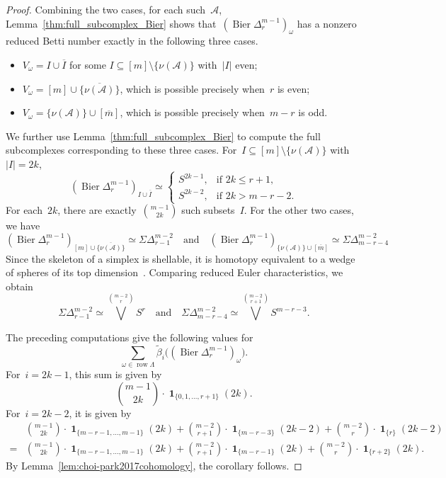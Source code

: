 \documentclass[11pt]{amsart}
\theoremstyle{plain}
\numberwithin{equation}{section}
\theoremstyle{definition}
\newcommand{\cA}{\mathcal{A}}
\DeclareMathOperator{\row}{row}
\DeclareMathOperator{\Bier}{Bier}
\DeclareMathOperator{\ind}{\mathbf{1}}
\begin{document}
\begin{proof}
Combining the two cases, for each such~$\cA$, Lemma~\ref{thm:full_subcomplex_Bier} shows that~$(\Bier\Delta_r^{m-1})_\omega$ has a nonzero reduced Betti number exactly in the following three cases.
\begin{itemize}
    \item $V_\omega=I\cup\overline{I}$ for some $I\subseteq[m]\setminus\{\nu(\cA)\}$ with~$|I|$ even;
    \item $V_\omega=[m]\cup\{\overline{\nu(\cA)}\}$, which is possible precisely when~$r$ is even;
    \item $V_\omega=\{\nu(\cA)\}\cup[\overline{m}]$, which is possible precisely when~$m-r$ is odd. 
\end{itemize}
We further use Lemma~\ref{thm:full_subcomplex_Bier} to compute the full subcomplexes corresponding to these three cases. 
For~$I\subseteq[m]\setminus\{\nu(\cA)\}$ with~$|I|=2k$, 
$$
    (\Bier\Delta_r^{m-1})_{I\cup\overline{I}} \simeq 
    \begin{cases} 
        S^{2k-1}, & \text{if } 2k\leq r+1,\\ 
        S^{2k-2}, & \text{if } 2k>m-r-2. 
    \end{cases}
$$
For each~$2k$, there are exactly~$\binom{m-1}{2k}$ such subsets~$I$. 
For the other two cases, we have
$$ 
    (\Bier\Delta_r^{m-1})_{[m]\cup\{\overline{\nu(\cA)}\}} \simeq \Sigma\Delta_{r-1}^{m-2} 
    \quad \text{and} \quad 
    (\Bier\Delta_r^{m-1})_{\{\nu(\cA)\}\cup[\overline{m}]} \simeq \Sigma\Delta_{m-r-4}^{m-2}
$$
Since the skeleton of a simplex is shellable, it is homotopy equivalent to a wedge of spheres of its top dimension~\cite[Theorems~3.1.3 and~3.1.7]{Wachs2007}.
Comparing reduced Euler characteristics, we obtain
$$
    \Sigma\Delta_{r-1}^{m-2}
    \simeq
    \bigvee^{\binom{m-2}{r}} S^r
    \quad\text{and}\quad
    \Sigma\Delta_{m-r-4}^{m-2}
    \simeq
    \bigvee^{\binom{m-2}{r+1}} S^{m-r-3}.
$$

The preceding computations give the following values for
$$
    \sum_{\omega\in\row\Lambda}
    \widetilde{\beta}_{i}\bigl((\Bier\Delta_r^{m-1})_\omega\bigr).
$$
For~$i=2k-1$, this sum is given by
$$
    \binom{m-1}{2k}
    \cdot\ind_{\{0,1,\ldots,r+1\}}(2k).
$$
For~$i=2k-2$, it is given by
\begin{align*}
   & \binom{m-1}{2k}
    \cdot\ind_{\{m-r-1, \ldots, m-1\}}(2k)+
    \binom{m-2}{r+1}
    \cdot\ind_{\{m-r-3\}}(2k-2)
    +
    \binom{m-2}{r}
    \cdot\ind_{\{r\}}(2k-2) \\
  = & \binom{m-1}{2k}
    \cdot\ind_{\{m-r-1, \ldots, m-1\}}(2k)+
    \binom{m-2}{r+1}
    \cdot\ind_{\{m-r-1\}}(2k)
    +
    \binom{m-2}{r}
    \cdot\ind_{\{r+2\}}(2k).
\end{align*}
By Lemma~\ref{lem:choi-park2017cohomology}, the corollary follows.
\end{proof}
\end{document}
